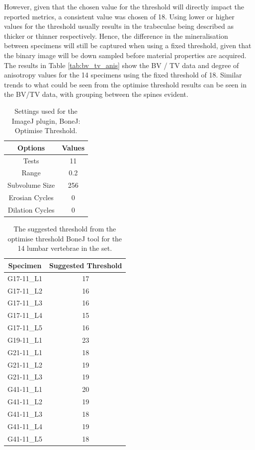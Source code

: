 However, given that the chosen value for the threshold will directly impact the
reported metrics, a consistent value was chosen of 18. Using lower or
higher values for the threshold usually results in the trabeculae being
described as thicker or thinner respectively. Hence, the difference in the
mineralisation between specimens will still be captured when using a fixed
threshold, given that the binary image will be down sampled before material
properties are acquired. The results in Table \ref{tab:bv_tv_anis} show the BV /
TV data and degree of anisotropy values for the 14 specimens using the fixed
threshold of 18. Similar trends to what could be seen from the optimise
threshold results can be seen in the BV/TV data, with grouping between the
spines evident.

\begin{table}[ht!]
	\caption{Settings used for the ImageJ plugin, BoneJ: Optimise Threshold.}
	\label{tab:bonej}
	\centering
	\begin{tabular}{c|c}
    Options & Values \\
    \hline
    \hline
    Tests & 11  \\
    Range & 0.2 \\
    Subvolume Size & 256 \\
    Erosian Cycles & 0 \\
    Dilation Cycles & 0 \\
    \hline
	\end{tabular}
\end{table}

\begin{table}[ht!]
	\caption{The suggested threshold from the optimise threshold BoneJ tool for
    the 14 lumbar vertebrae in the set.}
	\label{tab:optTH}
	\centering
	\begin{tabular}{c|c}
    Specimen    & Suggested Threshold   \\ \hline \hline
    G17-11\_L1 & 17 \\
    G17-11\_L2 & 16\\
    G17-11\_L3 & 16\\
    G17-11\_L4 & 15\\
    G17-11\_L5 & 16\\
    G19-11\_L1 & 23\\
    G21-11\_L1 & 18\\
    G21-11\_L2 & 19\\
    G21-11\_L3 & 19\\
    G41-11\_L1 & 20\\
    G41-11\_L2 & 19\\
    G41-11\_L3 & 18\\
    G41-11\_L4 & 19\\
    G41-11\_L5 & 18\\
    \hline
	\end{tabular}
\end{table}

